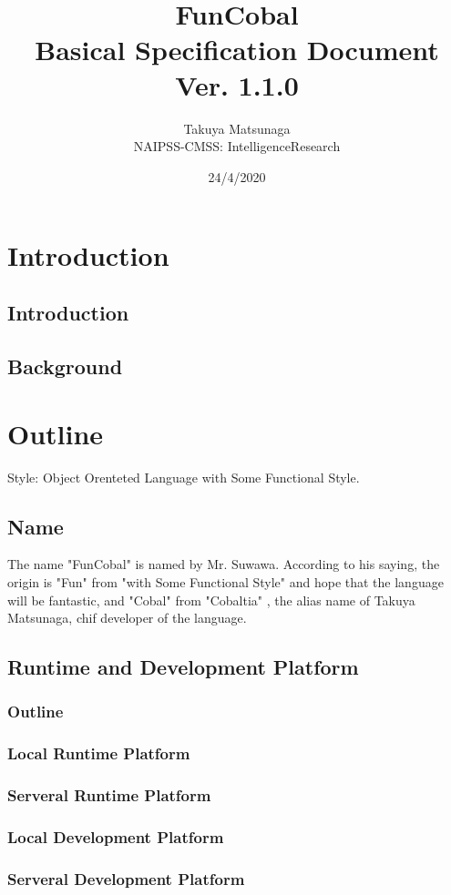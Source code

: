 \documentclass{jarticle}
\title{\\ \\ FunCobal \\ Basical Specification Document \\ Ver. 1.1.0}
\author{Takuya Matsunaga \\ NAIPSS-CMSS: IntelligenceResearch}
\date{24/4/2020}
\begin{document}
\maketitle
\tableofcontents
\newpage
\section{Introduction}
\subsection{Introduction}
\subsection{Background}
\section{Outline}
\par
 Style: Object Orenteted Language with Some Functional Style.
\subsection{Name}
 The name "FunCobal" is named by Mr. Suwawa. According to his saying, the origin is "Fun" from "with Some Functional Style" and hope that the language will be fantastic, and "Cobal" from "Cobaltia" , the alias name of Takuya Matsunaga, chif developer of the language.
\subsection{Runtime and Development Platform}
\subsubsection{Outline}
\subsubsection{Local Runtime Platform}
\subsubsection{Serveral Runtime Platform}
\subsubsection{Local Development Platform}
\subsubsection{Serveral Development Platform}
\end{document}
